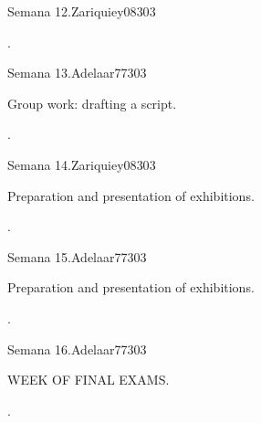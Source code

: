 \begin{syllabus}
\begin{unit}{}{Semana 12.}{Zariquiey08}{30}{3}
   \begin{learningoutcomes}
      \item .
   \end{learningoutcomes}
\end{unit}

\begin{unit}{}{Semana 13.}{Adelaar77}{30}{3}
   \begin{topics}
      \item Group work: drafting a script.
   \end{topics}

   \begin{learningoutcomes}
      \item .
   \end{learningoutcomes}
\end{unit}

\begin{unit}{}{Semana 14.}{Zariquiey08}{30}{3}
   \begin{topics}
      \item Preparation and presentation of exhibitions.
   \end{topics}

   \begin{learningoutcomes}
      \item .
   \end{learningoutcomes}
\end{unit}

\begin{unit}{}{Semana 15.}{Adelaar77}{30}{3}
   \begin{topics}
      \item Preparation and presentation of exhibitions.
   \end{topics}

   \begin{learningoutcomes}
      \item .
   \end{learningoutcomes}
\end{unit}

\begin{unit}{}{Semana 16.}{Adelaar77}{30}{3}
   \begin{topics}
      \item WEEK OF FINAL EXAMS.
   \end{topics}

   \begin{learningoutcomes}
      \item .
   \end{learningoutcomes}
\end{unit}



\begin{coursebibliography}
\end{coursebibliography}

\end{syllabus}
